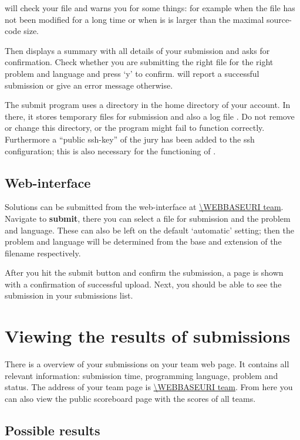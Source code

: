  will check your file and warns you for some things:
for example when the file has not been modified for a long time or
when is is larger than the maximal source-code size.

Then  displays a summary with all details of your
submission and asks for confirmation. Check whether you are submitting
the right file for the right problem and language and press `y' to
confirm.  will report a successful submission or give
an error message otherwise.

The submit program uses a directory \cmd{\USERSUBMITDIR} in the
home directory of your account. In there, it stores temporary files for
submission and also a log file . Do not remove or
change this directory, or the  program might fail to
function correctly. Furthermore a ``public ssh-key'' of the jury has
been added to the ssh configuration; this is also necessary for the
functioning of .

\subsection{Web-interface}

Solutions can be submitted from the web-interface at \url{\WEBBASEURI team}.
Navigate to \textbf{submit}, there you can select a file for
submission and the problem and language. These can also be left on the
default `automatic' setting; then the problem and language will be
determined from the base and extension of the filename respectively.

After you hit the submit button and confirm the submission, a page is
shown with a confirmation of successful upload. Next, you should be
able to see the submission in your submissions list.

\section{Viewing the results of submissions}

There is a overview of your submissions on your team web page.
It contains all relevant information: submission time, programming
language, problem and status. The address of your team page is
\url{\WEBBASEURI team}. From here you can also view the public
scoreboard page with the scores of all teams.

\subsection{Possible results}

